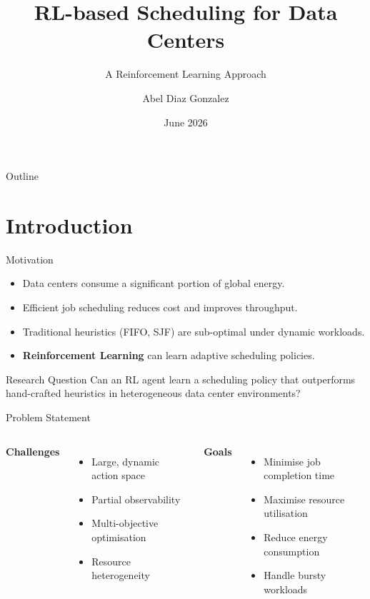 \documentclass[aspectratio=169]{beamer}  %
\title[RL Scheduling for DCs]{RL-based Scheduling for Data Centers}
\subtitle{A Reinforcement Learning Approach}
\author[A. Diaz Gonzalez]{Abel Diaz Gonzalez}
\institute[Your University]{%
  Department / Lab Name \\
  Your University or Institution
}
\date{June 2026}
\begin{document}
\begin{frame}
  \titlepage
\end{frame}

\begin{frame}{Outline}
  \tableofcontents
\end{frame}

\section{Introduction}

\begin{frame}{Motivation}
  \begin{itemize}
    \item Data centers consume a significant portion of global energy.
    \item Efficient job scheduling reduces cost and improves throughput.
    \item Traditional heuristics (FIFO, SJF) are sub-optimal under dynamic workloads.
    \item<2-> \textbf{Reinforcement Learning} can learn adaptive scheduling policies.
  \end{itemize}

  \vspace{0.5em}
  \begin{block}{Research Question}
    Can an RL agent learn a scheduling policy that outperforms hand-crafted
    heuristics in heterogeneous data center environments?
  \end{block}
\end{frame}

\begin{frame}{Problem Statement}
  \begin{columns}[T]
      \textbf{Challenges}
      \begin{itemize}
        \item Large, dynamic action space
        \item Partial observability
        \item Multi-objective optimisation
        \item Resource heterogeneity
      \end{itemize}

      \textbf{Goals}
      \begin{itemize}
        \item Minimise job completion time
        \item Maximise resource utilisation
        \item Reduce energy consumption
        \item Handle bursty workloads
      \end{itemize}
  \end{columns}
\end{frame}
\end{document}
